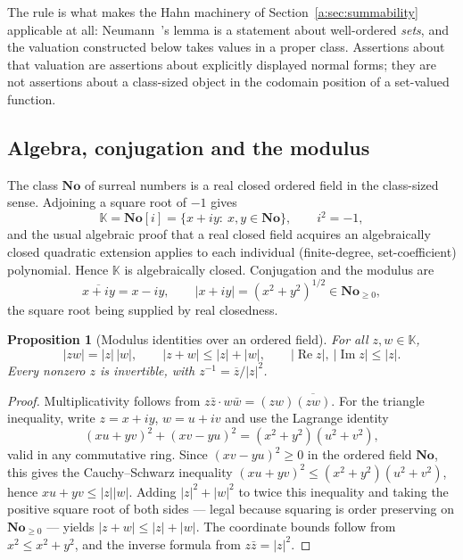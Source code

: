 \documentclass[11pt,a4paper]{article}
\numberwithin{equation}{section}
\newtheorem{proposition}[theorem]{Proposition}
\theoremstyle{definition}
\theoremstyle{remark}
\theoremstyle{plain}
\newcommand{\K}{\mathbb K}
\newcommand{\No}{\mathbf{No}}
\newcommand{\abs}[1]{\lvert #1\rvert}
\begin{document}
\noindent
The rule is what makes the Hahn machinery of
Section~\ref{a:sec:summability} applicable at all: Neumann~\cite{Neumann}'s lemma is a
statement about well-ordered \emph{sets}, and the valuation constructed
below takes values in a proper class.  Assertions about that valuation
are assertions about explicitly displayed normal forms; they are not
assertions about a class-sized object in the codomain position of a
set-valued function.

\subsection{Algebra, conjugation and the modulus}\label{a:sec:algebra}

The class $\No$ of surreal numbers is a real closed ordered field in the
class-sized sense.  Adjoining a square root of $-1$ gives
\[
 \K=\No[i]=\{x+iy:\ x,y\in\No\},\qquad i^2=-1 ,
\]
and the usual algebraic proof that a real closed field acquires an
algebraically closed quadratic extension applies to each individual
(finite-degree, set-coefficient) polynomial.  Hence $\K$ is
algebraically closed.  Conjugation and the modulus are
\[
 \overline{x+iy}=x-iy,\qquad
 \abs{x+iy}=(x^2+y^2)^{1/2}\in\No_{\ge0},
\]
the square root being supplied by real closedness.

\begin{proposition}[Modulus identities over an ordered field]\label{a:prop:triangle}
For all $z,w\in\K$,
\[
 \abs{zw}=\abs z\,\abs w,\qquad
 \abs{z+w}\le\abs z+\abs w,\qquad
 \abs{\operatorname{Re}z},\ \abs{\operatorname{Im}z}\le\abs z .
\]
Every nonzero $z$ is invertible, with $z^{-1}=\overline z/\abs z^{2}$.
\end{proposition}

\begin{proof}
Multiplicativity follows from $z\bar z\cdot w\bar w=(zw)\overline{(zw)}$.
For the triangle inequality, write $z=x+iy$, $w=u+iv$ and use the
Lagrange identity
\[
 (xu+yv)^2+(xv-yu)^2=(x^2+y^2)(u^2+v^2),
\]
valid in any commutative ring.  Since $(xv-yu)^2\ge0$ in the ordered
field $\No$, this gives the Cauchy--Schwarz inequality
$(xu+yv)^2\le(x^2+y^2)(u^2+v^2)$, hence
$xu+yv\le\abs z\abs w$.  Adding $\abs z^2+\abs w^2$ to twice this
inequality and taking the positive square root of both sides --- legal
because squaring is order preserving on $\No_{\ge0}$ --- yields
$\abs{z+w}\le\abs z+\abs w$.  The coordinate bounds follow from
$x^2\le x^2+y^2$, and the inverse formula from $z\bar z=\abs z^2$.
\end{proof}
\end{document}
